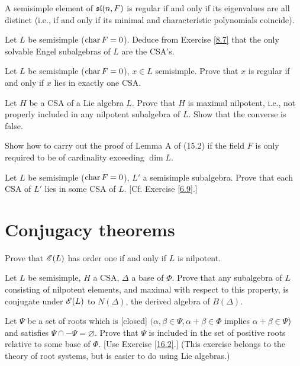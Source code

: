 \begin{ex}
  A semisimple element of $\sl(n, F)$ is regular if and only if its eigenvalues are all distinct (i.e., if and only if its minimal and characteristic polynomials coincide).
\end{ex}

\begin{ex}
  Let $L$ be semisimple ($\Char F = 0$). Deduce from Exercise \ref{8.7} that the only solvable Engel subalgebras of $L$ are the CSA's.
\end{ex}

\begin{ex}
  Let $L$ be semisimple ($\Char F = 0$), $x \in L$ semisimple. Prove that $x$ is regular if and only if $x$ lies in exactly one CSA.
\end{ex}

\begin{ex}
  Let $H$ be a CSA of a Lie algebra $L$. Prove that $H$ is maximal nilpotent, i.e., not properly included in any nilpotent subalgebra of $L$. Show that the converse is false.
\end{ex}

\begin{ex}
  Show how to carry out the proof of Lemma A of (15.2) if the field $F$ is only required to be of cardinality exceeding $\dim L$.
\end{ex}

\begin{ex}
  Let $L$ be semisimple ($\Char F = 0$), $L'$ a semisimple subalgebra. Prove that each CSA of $L'$ lies in some CSA of $L$. [Cf. Exercise \ref{6.9}.]
\end{ex}

\section{Conjugacy theorems}
\begin{ex}
  Prove that $\Eee(L)$ has order one if and only if $L$ is nilpotent.
\end{ex}

\begin{ex}\label{16.2}
  Let $L$ be semisimple, $H$ a CSA, $\Delta$ a base of $\Phi$. Prove that any subalgebra of $L$ consisting of nilpotent elements, and maximal with respect to this property, is conjugate under $\Eee(L)$ to $N(\Delta)$, the derived algebra of $B(\Delta)$.
\end{ex}

\begin{ex}
  Let $\Psi$ be a set of roots which is [closed] $(\alpha, \beta \in\Psi, \alpha+\beta \in\Phi$ implies $\alpha+\beta\in\Psi$) and satisfies $\Psi\cap -\Psi=\varnothing$.
  Prove that $\Psi$ is included in the set of positive roots relative to some base of $\Phi$. [Use Exercise \ref{16.2}.] (This exercise
belongs to the theory of root systems, but is easier to do using Lie algebras.)
\end{ex}

